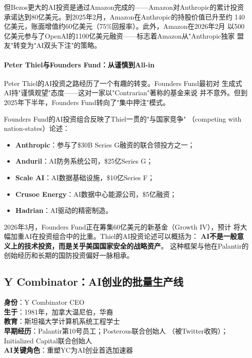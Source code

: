 但Bezos更大的AI投资是通过Amazon完成的——Amazon对Anthropic的累计投资
承诺达到80亿美元。到2025年2月，Amazon在Anthropic的持股价值已升至约
140亿美元，账面增值约60亿美元（75\%回报率）。此外，Amazon在2026年2月
以500亿美元参与了OpenAI的1100亿美元融资——标志着Amazon从"Anthropic独家
盟友"转变为"AI双头下注"的策略。

\paragraph{Peter Thiel与Founders Fund：从谨慎到All-in}

Peter Thiel的AI投资之路经历了一个有趣的转变。Founders Fund最初对
生成式AI持"谨慎观望"态度——这对一家以"Contrarian"著称的基金来说
并不意外。但到2025年下半年，Founders Fund转向了"集中押注"模式。

Founders Fund的AI投资组合反映了Thiel一贯的"与国家竞争"
（competing with nation-states）论述：
\begin{itemize}
  \item \textbf{Anthropic}：参与了\$30B Series G融资的联合领投方之一；
  \item \textbf{Anduril}：AI防务系统公司，\$25亿Series G；
  \item \textbf{Scale AI}：AI数据基础设施，\$10亿Series F；
  \item \textbf{Crusoe Energy}：AI数据中心能源公司，\$5亿融资；
  \item \textbf{Hadrian}：AI驱动的精密制造。
\end{itemize}

2026年3月，Founders Fund正在筹集60亿美元的新基金（Growth IV），预计
将大幅加重AI在投资组合中的比重。Thiel的AI投资论述可以概括为：
\textbf{AI不是一般意义上的技术投资，而是关乎美国国家安全的战略资产}。
这种框架与他在Palantir的创始经历和长期的国防投资偏好一脉相承。


\subsection{Y Combinator：AI创业的批量生产线}
\label{subsec:inv-yc}

\begin{corebox}
\textbf{身份}：Y Combinator CEO \\
\textbf{生于}：1981年，加拿大温尼伯，华裔 \\
\textbf{教育}：斯坦福大学计算机系统工程学士 \\
\textbf{早期经历}：Palantir第10号员工；Posterous联合创始人
  （被Twitter收购）；Initialized Capital联合创始人 \\
\textbf{AI关键角色}：重塑YC为AI创业首选加速器
\end{corebox}

